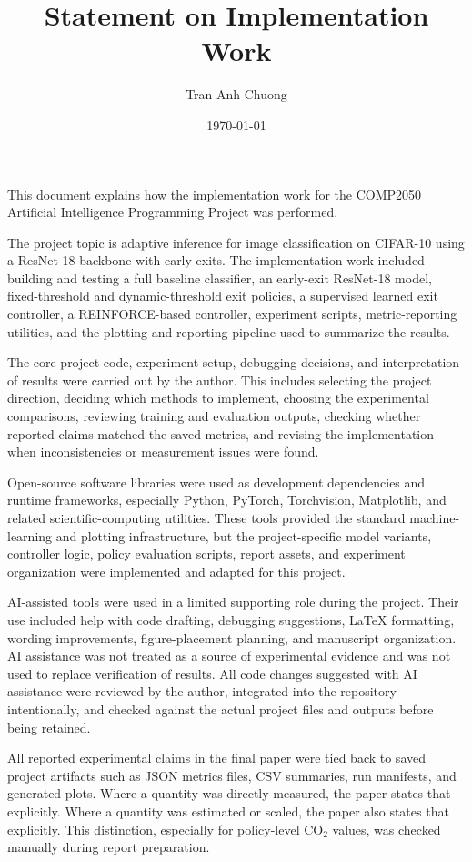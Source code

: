 \documentclass[11pt]{article}
\title{Statement on Implementation Work}
\author{Tran Anh Chuong}
\date{\today}
\begin{document}
\maketitle

This document explains how the implementation work for the COMP2050 Artificial Intelligence Programming Project was performed.

The project topic is adaptive inference for image classification on CIFAR-10 using a ResNet-18 backbone with early exits. The implementation work included building and testing a full baseline classifier, an early-exit ResNet-18 model, fixed-threshold and dynamic-threshold exit policies, a supervised learned exit controller, a REINFORCE-based controller, experiment scripts, metric-reporting utilities, and the plotting and reporting pipeline used to summarize the results.

The core project code, experiment setup, debugging decisions, and interpretation of results were carried out by the author. This includes selecting the project direction, deciding which methods to implement, choosing the experimental comparisons, reviewing training and evaluation outputs, checking whether reported claims matched the saved metrics, and revising the implementation when inconsistencies or measurement issues were found.

Open-source software libraries were used as development dependencies and runtime frameworks, especially Python, PyTorch, Torchvision, Matplotlib, and related scientific-computing utilities. These tools provided the standard machine-learning and plotting infrastructure, but the project-specific model variants, controller logic, policy evaluation scripts, report assets, and experiment organization were implemented and adapted for this project.

AI-assisted tools were used in a limited supporting role during the project. Their use included help with code drafting, debugging suggestions, LaTeX formatting, wording improvements, figure-placement planning, and manuscript organization. AI assistance was not treated as a source of experimental evidence and was not used to replace verification of results. All code changes suggested with AI assistance were reviewed by the author, integrated into the repository intentionally, and checked against the actual project files and outputs before being retained.

All reported experimental claims in the final paper were tied back to saved project artifacts such as JSON metrics files, CSV summaries, run manifests, and generated plots. Where a quantity was directly measured, the paper states that explicitly. Where a quantity was estimated or scaled, the paper also states that explicitly. This distinction, especially for policy-level CO$_2$ values, was checked manually during report preparation.
\end{document}

